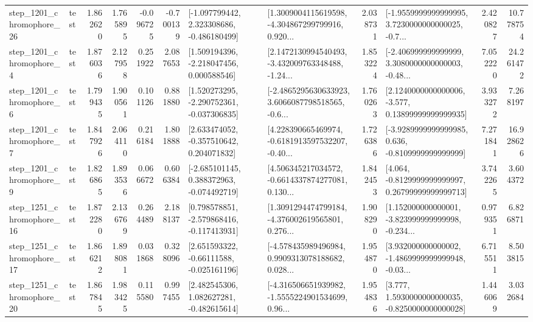 \begin{tabular}{llrrrrllrlrr}
 step\_1201\_chromophore\_26 &      test &      1.862620 &    1.765895 &     -0.096725 & -0.700139 &   [-1.097799442, 2.323308686, -0.486180499] &  [1.3009004115619598, -4.304867299799916, 0.920... &       2.038731 &  [-1.9559999999999995, 3.7230000000000025, -0.7... &            2.420827 &         10.778754 \\
  step\_1201\_chromophore\_4 &      test &      1.876036 &    2.127958 &      0.251922 &  2.087653 &    [1.509194396, -2.218047456, 0.000588546] &  [2.1472130994540493, -3.432009763348488, -1.24... &       1.853224 &  [-2.406999999999999, 3.3080000000000003, -0.48... &            7.052220 &         24.261472 \\
  step\_1201\_chromophore\_6 &      test &      1.799435 &    1.900561 &      0.101126 &  0.881880 &   [1.520273295, -2.290752361, -0.037306835] &  [-2.4865295630633923, 3.6066087798518565, -0.6... &       1.760263 &  [2.1240000000000006, -3.577, 0.13899999999999935] &            3.933272 &          7.268197 \\
  step\_1201\_chromophore\_7 &      test &      1.847926 &    2.064110 &      0.216184 &  1.801888 &    [2.633474052, -0.357510642, 0.204071832] &  [4.228390665469974, -0.6181913597532207, -0.40... &       1.726386 &  [-3.9289999999999985, 0.636, -0.8109999999999999] &            7.271841 &         16.928626 \\
  step\_1201\_chromophore\_9 &      test &      1.826865 &    1.893536 &      0.066672 &  0.606384 &   [-2.685101145, 0.388372963, -0.074492719] &  [4.506345217034572, -0.6614337874277081, 0.130... &       1.842453 &  [4.064, -0.8129999999999997, 0.26799999999999713] &            3.742265 &          3.604372 \\
 step\_1251\_chromophore\_16 &      test &      1.872280 &    2.136769 &      0.264489 &  2.188137 &   [0.798578851, -2.579868416, -0.117413931] &  [1.3091294474799184, -4.376002619565801, 0.276... &       1.908290 &  [1.152000000000001, -3.823999999999998, -0.234... &            0.979351 &          6.826871 \\
 step\_1251\_chromophore\_17 &      test &      1.866212 &    1.898081 &      0.031868 &  0.328096 &    [2.651593322, -0.66111588, -0.025161196] &  [-4.578435989496984, 0.9909313078188682, 0.028... &       1.954870 &  [3.932000000000002, -1.4869999999999948, -0.03... &            6.715511 &          8.503815 \\
 step\_1251\_chromophore\_20 &      test &      1.867845 &    1.983425 &      0.115580 &  0.997455 &    [2.482545306, 1.082627281, -0.482615614] &  [-4.316506651939982, -1.5555224901534699, 0.96... &       1.954836 &   [3.777, 1.5930000000000035, -0.8250000000000028] &            1.446069 &          3.032684 \\

\end{tabular}
